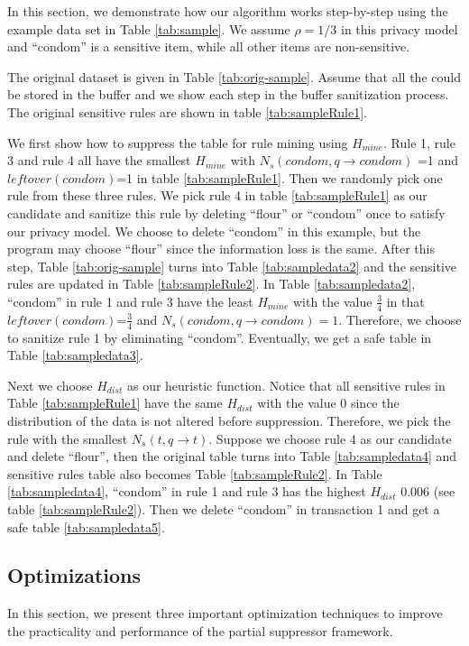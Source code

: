 In this section, we demonstrate how our algorithm works step-by-step
using the example data set in Table \ref{tab:sample}.
We assume $\rho=1/3$ in this privacy model and ``condom'' is a sensitive item,
while all other items are non-sensitive.

The original dataset is given in Table \ref{tab:orig-sample}.
Assume that all the \qids could be stored in the buffer and we show each step in the buffer sanitization process.
The original sensitive rules are shown in table \ref{tab:sampleRule1}.

We first show how to suppress the table for rule mining using $H_{mine}$.
Rule 1, rule 3 and rule 4 all have the smallest $H_{mine}$ with $N_s(condom, q\rightarrow condom)$ =1 and $leftover(condom)$=1 in table \ref{tab:sampleRule1}. Then we randomly pick one rule from these three rules. We pick rule 4
in table \ref{tab:sampleRule1} as our candidate and
sanitize this rule by deleting ``flour'' or ``condom'' once to satisfy our privacy model. We choose to delete ``condom'' in this example, but the program may choose ``flour''
since the information loss is the same.
After this step, Table \ref{tab:orig-sample} turns into
Table \ref{tab:sampledata2} and the sensitive rules are updated in
Table \ref{tab:sampleRule2}. In Table \ref{tab:sampledata2},
``condom'' in rule 1 and rule 3 have the least $H_{mine}$ with
the value $\frac{3}{4}$ in that $leftover(condom)$=$\frac{3}{4}$ and
$N_s(condom, q\rightarrow condom)=1$. Therefore, we choose to
sanitize rule 1 by eliminating ``condom''.
Eventually, we get a safe table in Table \ref{tab:sampledata3}.

Next we choose $H_{dist}$ as our heuristic function.
Notice that all sensitive rules in Table  \ref{tab:sampleRule1}
have the same $H_{dist}$ with the value 0 since the
distribution of the data is not altered before suppression.
Therefore, we pick the rule with the smallest
 $N_s(t, q\rightarrow t)$. Suppose we choose rule 4 as our candidate and
delete ``flour'', then the original table turns into
Table \ref{tab:sampledata4} and sensitive rules
table also becomes Table \ref{tab:sampleRule2}.
In Table \ref{tab:sampledata4}, ``condom'' in rule 1 and rule 3 has
 the highest $H_{dist}$ 0.006 (see table \ref{tab:sampleRule2}). Then we delete ``condom'' in transaction 1 and get a safe table \ref{tab:sampledata5}.

\subsection{Optimizations}
\label{algo:impmentation}
In this section, we present three important optimization techniques to
improve the practicality and performance of 
the partial suppressor framework. 

